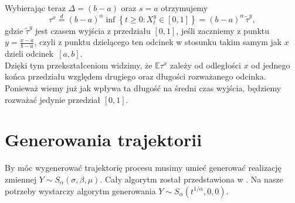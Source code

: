 \documentclass[12pt]{mwrep}
\begin{document}
	Wybierając teraz $\Delta=(b-a)$ oraz $s=a$ otrzymujemy
	\begin{equation}\label{eq:tau_przeskalowane}
		\tau^x\overset{d}{=}(b-a)^\alpha\inf\left\{t\geq0:X^y_t\in[0,1]\right\}=(b-a)^\alpha\,\widetilde\tau^y,
	\end{equation}
	gdzie $\widetilde\tau^y$ jest czasem wyjścia z przedziału $[0, 1]$, jeśli zaczniemy z punktu $y=\frac{x-a}{b-a}$, czyli z punktu dzielącego ten odcinek w stosunku takim samym jak $x$ dzieli odcinek~$[a, b]$.\vspace{1.5mm}\\
	\noindent Dzięki tym przekształceniom widzimy, że $\mathbb{E}\tau^x$ zależy od odległości $x$ od jednego końca przedziału względem drugiego oraz długości rozważanego odcinka. Ponieważ wiemy już jak wpływa ta długość na średni czas wyjścia, będziemy rozważać jedynie przedział $[0, 1]$.
	\section{Generowania trajektorii}	
	\noindent By móc wygenerować trajektorię procesu musimy umieć generować realizację zmiennej $Y\sim S_\alpha(\sigma,\beta,\mu)$. Cały algorytm został przedstawiona w \cite{art}. Na nasze potrzeby wystarczy algorytm generowania $Y\sim S_\alpha(t^{1/\alpha},0,0)$.\\
	
\end{document}
